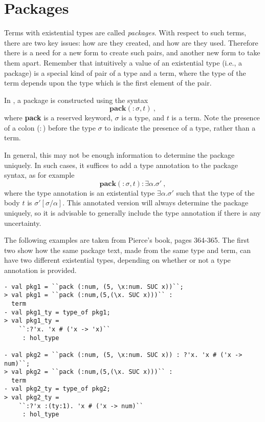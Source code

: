 \section{Packages}

Terms with existential types are called {\it packages}. 
With respect to such terms, there are two key issues: 
how are they created, and how are they used.
Therefore there is a need for a new form to create such pairs, 
and another new form to take them apart.
Remember that intuitively 
a value of an existential type 
(i.e., a package)
is
a special 
kind of 
pair of a type and a term,
where the type of the term depends upon the type which is the first element of the pair.

In \HOLW{}, a package is constructed using the syntax $$\mathbf{pack}({:}\sigma, t)\ ,$$ 
where {\bf pack} is a reserved keyword, $\sigma$ is a type, and $t$ is a term. 
Note the presence of a colon ($:$) before the type $\sigma$ 
to indicate the presence of a type, rather than a term.

In general, this may not be enough information to 
determine 
the package uniquely. In such cases, it suffices to
add a type annotation to the package syntax, as for example 
$$\mathbf{pack}({:}\sigma, t) : \exists\alpha.\sigma'\ ,$$
where the type annotation is an existential type $\exists\alpha.\sigma'$
such that the type of the body $t$ is $\sigma'[\sigma / \alpha]$.
This annotated version will always determine the package uniquely,
so it is advisable to generally include the type annotation if there is any
uncertainty.

The following examples are taken from Pierce's book, pages 364-365.
The first two show how the same package text, made from the same
type and term, can have two different existential types,
depending on whether or not a type annotation is provided.
\begin{session}
\begin{verbatim}
- val pkg1 = ``pack (:num, (5, \x:num. SUC x))``;
> val pkg1 = ``pack (:num,(5,(\x. SUC x)))`` :
  term
- val pkg1_ty = type_of pkg1;
> val pkg1_ty =
    ``:?'x. 'x # ('x -> 'x)``
     : hol_type
     
- val pkg2 = ``pack (:num, (5, \x:num. SUC x)) : ?'x. 'x # ('x -> num)``;
> val pkg2 = ``pack (:num,(5,(\x. SUC x)))`` :
  term
- val pkg2_ty = type_of pkg2;
> val pkg2_ty =
    ``:?'x :(ty:1). 'x # ('x -> num)``
     : hol_type
\end{verbatim}
\end{session}

